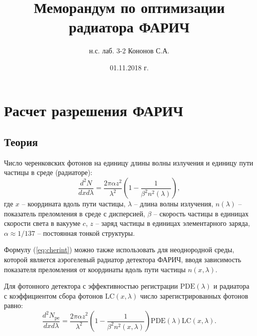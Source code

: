 \documentclass[12pt]{article}
\title{\Large\bf Меморандум по оптимизации радиатора ФАРИЧ}
\author{\large н.с. лаб. 3-2 Кононов С.А.}
\date{\large 01.11.2018 г.}
\begin{document}
\maketitle

\section{Расчет разрешения ФАРИЧ}
\subsection{Теория}
Число черенковских фотонов на единицу длины волны излучения и единицу пути частицы в среде (радиаторе):
\begin{equation}
\frac{d^2N}{dx d\lambda} = \frac{2\pi\alpha z^2}{\lambda^2}\left(1 - \frac{1}{\beta^2 n^2(\lambda)}\right),
\label{eq:cherint}
\end{equation}
где $x$ -- координата вдоль пути частицы, $\lambda$ -- длина волны излучения,
$n(\lambda)$ -- показатель преломления в среде с дисперсией,
$\beta$ -- скорость частицы в единицах скорости света в вакууме $c$, $z$ -- заряд частицы в единицах элементарного заряда, 
$\alpha\approx 1/137$ -- постоянная тонкой структуры.

Формулу (\ref{eq:cherint}) можно также использовать для неоднородной среды, которой является аэрогелевый радиатор детектора ФАРИЧ, вводя
зависимость показателя преломления от координаты вдоль пути частицы $n(x,\lambda)$.

Для фотонного детектора с эффективностью регистрации $\mathrm{PDE}(\lambda)$ и радиатора с коэффициентом сбора 
фотонов $\mathrm{LC}(x,\lambda)$ число зарегистрированных фотонов равно:
\begin{equation}
\frac{d^2N_\mathrm{pe}}{dx d\lambda} = \frac{2\pi\alpha z^2}{\lambda^2}\left(1 - \frac{1}{\beta^2 n^2(x,\lambda)}\right)
\mathrm{PDE}(\lambda)\mathrm{LC}(x,\lambda).
\label{eq:cherintdet}
\end{equation}
\end{document}
